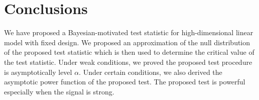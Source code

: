 \documentclass[11pt]{article}
\newcommand{\bfsym}[1]{\ensuremath{\boldsymbol{#1}}}
\def\bbeta{\bfsym \beta}
\theoremstyle{plain}
\theoremstyle{definition}
\theoremstyle{remark}
\begin{document}
%
%









\section{Conclusions}\label{sec:conclusions}
We have proposed a Bayesian-motivated test statistic for high-dimensional linear model with fixed design.
We proposed an approximation of the null distribution of the proposed test statistic which is then used to determine the critical value of the test statistic.
Under weak conditions, we proved the proposed test procedure is asymptotically level $\alpha$.
Under certain conditions, we also derived the asymptotic power function of the proposed test.
The proposed test is powerful especially when the signal is strong.
\end{document}
